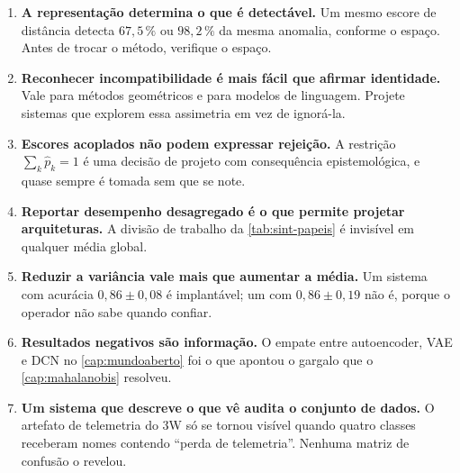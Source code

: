\begin{enumerate}[leftmargin=*,itemsep=0.5em]

\item \textbf{A representação determina o que é detectável.} Um mesmo escore de
distância detecta $67{,}5\,\%$ ou $98{,}2\,\%$ da mesma anomalia, conforme o espaço.
Antes de trocar o método, verifique o espaço.

\item \textbf{Reconhecer incompatibilidade é mais fácil que afirmar identidade.} Vale
para métodos geométricos e para modelos de linguagem. Projete sistemas que explorem essa
assimetria em vez de ignorá-la.

\item \textbf{Escores acoplados não podem expressar rejeição.} A restrição
$\sum_k \hat{p}_k = 1$ é uma decisão de projeto com consequência epistemológica, e quase
sempre é tomada sem que se note.

\item \textbf{Reportar desempenho desagregado é o que permite projetar arquiteturas.} A
divisão de trabalho da \cref{tab:sint-papeis} é invisível em qualquer média global.

\item \textbf{Reduzir a variância vale mais que aumentar a média.} Um sistema com
acurácia $0{,}86 \pm 0{,}08$ é implantável; um com $0{,}86 \pm 0{,}19$ não é, porque o
operador não sabe quando confiar.

\item \textbf{Resultados negativos são informação.} O empate entre autoencoder, VAE e DCN
no \cref{cap:mundoaberto} foi o que apontou o gargalo que o \cref{cap:mahalanobis}
resolveu.

\item \textbf{Um sistema que descreve o que vê audita o conjunto de dados.} O artefato de
telemetria do 3W só se tornou visível quando quatro classes receberam nomes contendo
``perda de telemetria''. Nenhuma matriz de confusão o revelou.

\end{enumerate}

